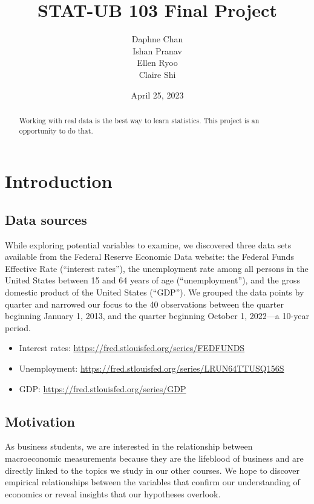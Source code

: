 \documentclass[12pt]{article}
\begin{document}
\def\spacingset#1{\renewcommand{\baselinestretch}
{#1}\small\normalsize} \spacingset{1}
\title{\bf STAT-UB 103 Final Project}
\author{Daphne Chan\\
Ishan Pranav\\
Ellen Ryoo\\
Claire Shi}
\date{April 25, 2023}
\maketitle
\bigskip
\begin{abstract}
Working with real data is the best way to learn statistics. This project is an opportunity to do that.
\end{abstract}
\newpage
\spacingset{1.08}
\section{Introduction}
\subsection{Data sources}
While exploring potential variables to examine, we discovered three data sets available from the Federal Reserve Economic Data website: the Federal Funds Effective Rate (``interest rates''), the unemployment rate among all persons in the United States between 15 and 64 years of age (``unemployment''), and the gross domestic product of the United States (``GDP''). We grouped the data points by quarter and narrowed our focus to the 40 observations between the quarter beginning January 1, 2013, and the quarter beginning October 1, 2022---a 10-year period. 
\begin{itemize}
\item Interest rates: \url{https://fred.stlouisfed.org/series/FEDFUNDS}
\item Unemployment: \url{https://fred.stlouisfed.org/series/LRUN64TTUSQ156S}
\item GDP: \url{https://fred.stlouisfed.org/series/GDP}
\end{itemize}
\subsection{Motivation}
As business students, we are interested in the relationship between macroeconomic measurements because they are the lifeblood of business and are directly linked to the topics we study in our other courses. We hope to discover empirical relationships between the variables that confirm our understanding of economics or reveal insights that our hypotheses overlook. 
\end{document}
